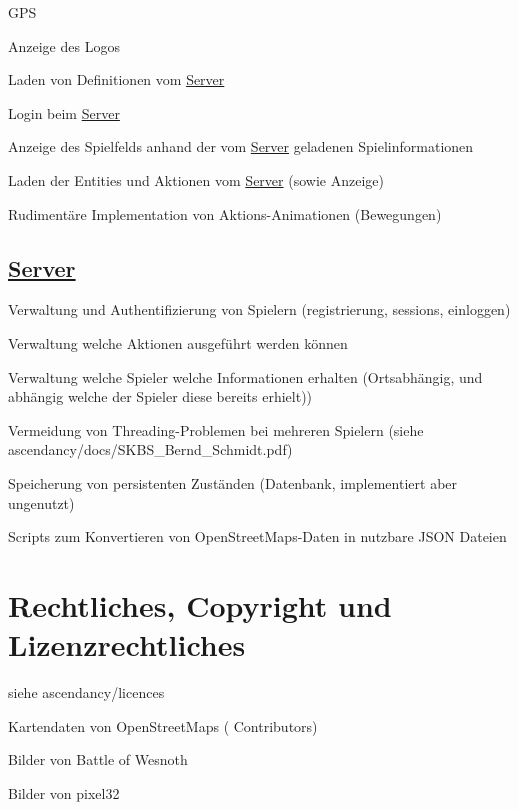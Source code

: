 \begin{DoxyItemize}
\item G\-P\-S
\item Anzeige des Logos
\item Laden von Definitionen vom \hyperlink{namespaceServer}{Server}
\item Login beim \hyperlink{namespaceServer}{Server}
\item Anzeige des Spielfelds anhand der vom \hyperlink{namespaceServer}{Server} geladenen Spielinformationen
\item Laden der Entities und Aktionen vom \hyperlink{namespaceServer}{Server} (sowie Anzeige)
\item Rudimentäre Implementation von Aktions-\/\-Animationen (Bewegungen)
\end{DoxyItemize}

\subsection*{\hyperlink{namespaceServer}{Server}}


\begin{DoxyItemize}
\item Verwaltung und Authentifizierung von Spielern (registrierung, sessions, einloggen)
\item Verwaltung welche Aktionen ausgeführt werden können
\item Verwaltung welche Spieler welche Informationen erhalten (Ortsabhängig, und abhängig welche der Spieler diese bereits erhielt))
\item Vermeidung von Threading-\/\-Problemen bei mehreren Spielern (siehe ascendancy/docs/\-S\-K\-B\-S\-\_\-\-Bernd\-\_\-\-Schmidt.\-pdf)
\item Speicherung von persistenten Zuständen (Datenbank, implementiert aber ungenutzt)
\item Scripts zum Konvertieren von Open\-Street\-Maps-\/\-Daten in nutzbare J\-S\-O\-N Dateien
\end{DoxyItemize}

\section*{Rechtliches, Copyright und Lizenzrechtliches}

siehe ascendancy/licences
\begin{DoxyItemize}
\item Kartendaten von Open\-Street\-Maps ( Contributors)
\item Bilder von Battle of Wesnoth
\item Bilder von pixel32 
\end{DoxyItemize}